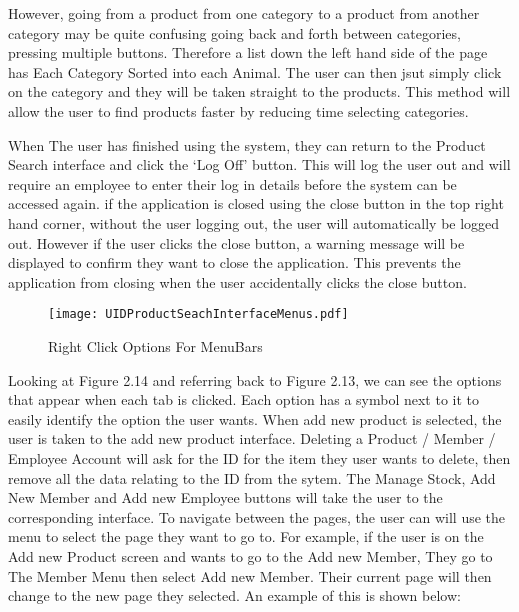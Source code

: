 However, going from a product from one category to a product from another category may be quite confusing going back and forth between categories, pressing multiple buttons. Therefore a list down the left hand side of the page has Each Category Sorted into each Animal. The user can then jsut simply click on the category and they will be taken straight to the products. This method will allow the user to find products faster by reducing time selecting categories. \par

When The user has finished using the system, they can return to the Product Search interface and click the `Log Off' button. This will log the user out and will require an employee to enter their log in details before the system can be accessed again. if the application is closed using the close button in the top right hand corner, without the user logging out, the user will automatically be logged out. However if the user clicks the close button, a warning message will be displayed to confirm they want to close the application. This prevents the application from closing when the user accidentally clicks the close button. \par

\begin{figure}[H]
\caption{Right Click Options For MenuBars} \label{fig:Right Click Options For MenuBars}
\hfill\texttt{[image: UIDProductSeachInterfaceMenus.pdf]}\hspace*{\fill}
\end{figure}

Looking at Figure 2.14 and referring back to Figure 2.13, we can see the options that appear when each tab is clicked. Each option has a symbol next to it to easily identify the option the user wants. When add new product is selected, the user is taken to the add new product interface. Deleting a Product / Member / Employee Account will ask for the ID for the item they user wants to delete, then remove all the data relating to the ID from the sytem. The Manage Stock, Add New Member and Add new Employee buttons will take the user to the corresponding interface. To navigate between the pages, the user can will use the menu to select the page they want to go to. For example, if the user is on the Add new Product screen and wants to go to the Add new Member, They go to The Member Menu then select Add new Member. Their current page will then change to the new page they selected. An example of this is shown below:\par

